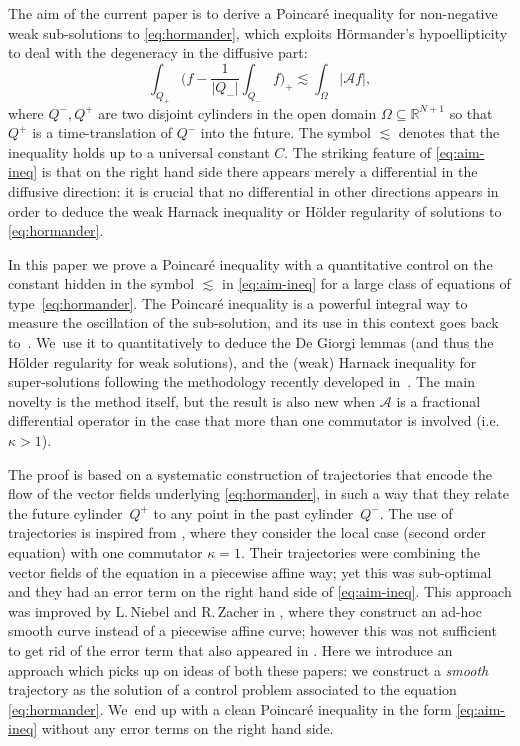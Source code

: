 \documentclass[10pt]{amsart}
\providecommand{\ie}{i.e.}
\theoremstyle{definition}
\newcommand{\cA}{{\mathcal A}}
\begin{document}
The aim of the current paper is to derive a Poincaré inequality for non-negative weak sub-solutions to \eqref{eq:hormander},
which exploits Hörmander's hypoellipticity to deal with the degeneracy in the diffusive part:
\begin{equation}\label{eq:aim-ineq}
\int_{Q_+} \biggl(f - \frac{1}{|Q_-|} \int_{Q_-} f
\biggr)_+ \lesssim \int_\Omega |\cA f|,
\end{equation}
where $Q^-,Q^+$ are two disjoint cylinders in the open domain
$\Omega \subseteq \mathbb{R}^{N+1}$ so that $Q^+$ is a time-translation of $Q^-$ into the
future. The symbol $\lesssim$ denotes that the inequality holds up to a universal constant $C$.
The striking feature of \eqref{eq:aim-ineq} is that on the right hand side there appears merely a differential in the diffusive direction: it is crucial that no differential in other directions appears in order to deduce the weak Harnack inequality or Hölder regularity of solutions to \eqref{eq:hormander}.

In this paper we prove a Poincaré inequality with a
quantitative control on the constant hidden in the symbol $\lesssim$ in \eqref{eq:aim-ineq} for a large class of
equations of type~\eqref{eq:hormander}.
The Poincaré inequality is a
powerful integral way to measure the oscillation of the
sub-solution, and its use in this context goes back
to~\cite{nash,moser}. We~use it to quantitatively to deduce the De Giorgi
lemmas (and thus the Hölder regularity for weak solutions), and the (weak)
Harnack inequality for super-solutions following the methodology
recently developed
in~\cite{guerand-mouhot,loher-2022-preprint-quantitative-de-giorgi}. The main novelty is
the method itself, but the result is
also new when $\mathcal A$ is a fractional differential operator in the case that more than one commutator is
involved (\ie $\kappa > 1$).

The proof is based on a systematic construction of trajectories that encode the flow of the vector fields underlying \eqref{eq:hormander}, in such a way that they relate the future cylinder~$Q^+$ to any point in the past cylinder~$Q^-$.
The use of trajectories is inspired from \cite{guerand-mouhot}, where they consider the local case (second order equation) with one commutator $\kappa = 1$. Their trajectories were combining the vector fields of the equation in a piecewise affine way; yet this was sub-optimal and they had an error term on the right hand side of \eqref{eq:aim-ineq}. This approach was improved by L.\,Niebel and R.\,Zacher in \cite{niebel2022kinetic}, where they construct an ad-hoc smooth curve instead of a piecewise affine curve; however this was not sufficient to get rid of the error term that also appeared in \cite{guerand-mouhot}. Here we introduce an approach which picks up on ideas of both these papers: we construct a \textit{smooth} trajectory as the solution of a control problem associated to the equation \eqref{eq:hormander}. We~end up with a clean Poincaré inequality in the form \eqref{eq:aim-ineq} without any error terms on the right hand side.
\end{document}
